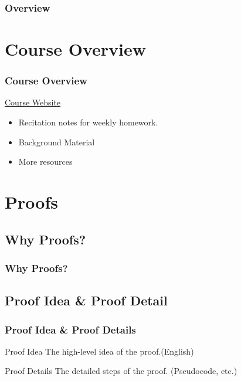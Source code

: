 \documentclass[t]{beamer}
\begin{document}
    \begin{frame}
        \frametitle{Overview}
        \tableofcontents
    \end{frame}



    \section{Course Overview}
        \begin{frame}
            \frametitle{Course Overview}
            \begin{block}{\href{https://www-student.cse.buffalo.edu/~atri/cse331/fall24/policies/syllabus.html}{Course Website}}
                \begin{itemize}
                    \item Recitation notes for weekly homework.
                    \item Background Material
                    \item More resources
                \end{itemize}
            \end{block}
        \end{frame}

    \section{Proofs}
        \subsection{Why Proofs?}
            \begin{frame}
                \frametitle{Why Proofs?}
            \end{frame}

        \subsection{Proof Idea \& Proof Detail}
            \begin{frame}
                \frametitle{Proof Idea \& Proof Details}
                \begin{block}{Proof Idea}
                    The high-level idea of the proof.(English)
                \end{block}

                \begin{block}{Proof Details}
                    The detailed steps of the proof. (Pseudocode, etc.)
                \end{block}
            \end{frame}
\end{document}
